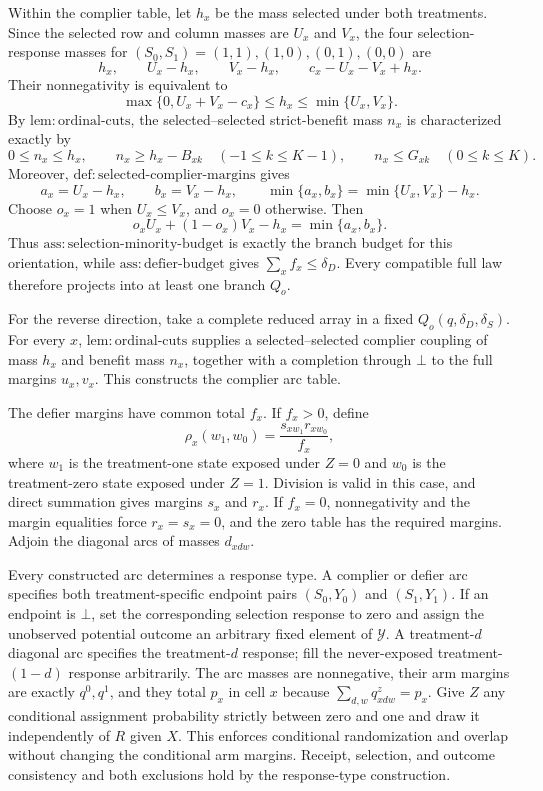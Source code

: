 Within the complier table, let \(h_x\) be the mass selected under both treatments. Since the selected row and column masses are \(U_x\) and \(V_x\), the four selection-response masses for \((S_0,S_1)=(1,1),(1,0),(0,1),(0,0)\) are
\[
 h_x,
 \qquad U_x-h_x,
 \qquad V_x-h_x,
 \qquad c_x-U_x-V_x+h_x.
\]
Their nonnegativity is equivalent to
\[
 \max\{0,U_x+V_x-c_x\}
 \leq h_x\leq\min\{U_x,V_x\}.
\]
By \(\mathrm{lem:ordinal\text{-}cuts}\), the selected--selected strict-benefit mass \(n_x\) is characterized exactly by
\[
 0\leq n_x\leq h_x,
 \qquad
 n_x\geq h_x-B_{xk}\quad(-1\leq k\leq K-1),
 \qquad
 n_x\leq G_{xk}\quad(0\leq k\leq K).
\]
Moreover, \(\mathrm{def:selected\text{-}complier\text{-}margins}\) gives
\[
 a_x=U_x-h_x,
 \qquad b_x=V_x-h_x,
 \qquad
 \min\{a_x,b_x\}=\min\{U_x,V_x\}-h_x.
\]
Choose \(o_x=1\) when \(U_x\leq V_x\), and \(o_x=0\) otherwise. Then
\[
 o_xU_x+(1-o_x)V_x-h_x=\min\{a_x,b_x\}.
\]
Thus \(\mathrm{ass:selection\text{-}minority\text{-}budget}\) is exactly the branch budget for this orientation, while \(\mathrm{ass:defier\text{-}budget}\) gives \(\sum_xf_x\leq\delta_D\). Every compatible full law therefore projects into at least one branch \(Q_o\).

For the reverse direction, take a complete reduced array in a fixed \(Q_o(q,\delta_D,\delta_S)\). For every \(x\), \(\mathrm{lem:ordinal\text{-}cuts}\) supplies a selected--selected complier coupling of mass \(h_x\) and benefit mass \(n_x\), together with a completion through \(\bot\) to the full margins \(u_x,v_x\). This constructs the complier arc table.

The defier margins have common total \(f_x\). If \(f_x>0\), define
\[
 \rho_x(w_1,w_0)
 =\frac{s_{xw_1}r_{xw_0}}{f_x},
\]
where \(w_1\) is the treatment-one state exposed under \(Z=0\) and \(w_0\) is the treatment-zero state exposed under \(Z=1\). Division is valid in this case, and direct summation gives margins \(s_x\) and \(r_x\). If \(f_x=0\), nonnegativity and the margin equalities force \(r_x=s_x=0\), and the zero table has the required margins. Adjoin the diagonal arcs of masses \(d_{xdw}\).

Every constructed arc determines a response type. A complier or defier arc specifies both treatment-specific endpoint pairs \((S_0,Y_0)\) and \((S_1,Y_1)\). If an endpoint is \(\bot\), set the corresponding selection response to zero and assign the unobserved potential outcome an arbitrary fixed element of \(\mathcal Y\). A treatment-\(d\) diagonal arc specifies the treatment-\(d\) response; fill the never-exposed treatment-\((1-d)\) response arbitrarily. The arc masses are nonnegative, their arm margins are exactly \(q^0,q^1\), and they total \(p_x\) in cell \(x\) because \(\sum_{d,w}q^z_{xdw}=p_x\). Give \(Z\) any conditional assignment probability strictly between zero and one and draw it independently of \(R\) given \(X\). This enforces conditional randomization and overlap without changing the conditional arm margins. Receipt, selection, and outcome consistency and both exclusions hold by the response-type construction.

